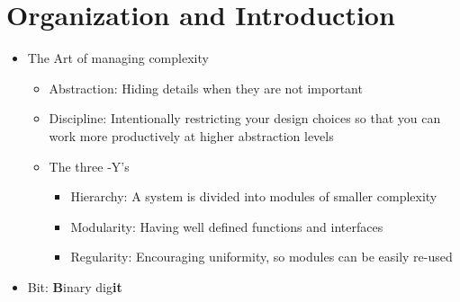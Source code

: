 \documentclass[a4paper]{article}
\begin{document}
\section{Organization and Introduction}
\begin{itemize}
\item The Art of managing complexity
\begin{itemize}
\item Abstraction: Hiding details when they are not important
\item Discipline: Intentionally restricting your design choices so that you can work more productively at higher abstraction levels
\item The three -Y's
\begin{itemize}
\item Hierarchy: A system is divided into modules of smaller complexity
\item Modularity: Having well defined functions and interfaces
\item Regularity: Encouraging uniformity, so modules can be easily re-used
\end{itemize}
\end{itemize}
\item Bit: \textbf{B}inary dig\textbf{it}
\end{itemize}
\end{document}
